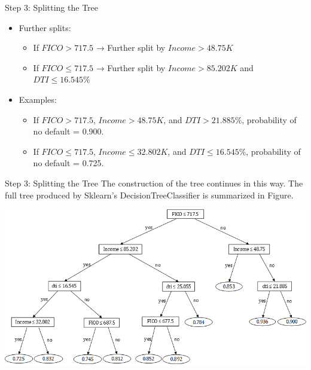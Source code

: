 \documentclass[11pt]{beamer}
\begin{document}
%
%
\begin{frame}{Step 3: Splitting the Tree}
    \begin{itemize}
        \item Further splits:
        \begin{itemize}
            \item If $FICO>717.5$ → Further split by $Income > 48.75K$
            \item If $FICO \le 717.5$ → Further split by $Income > 85.202K$ and $DTI \le 16.545\%$
        \end{itemize}
        \item Examples:
        \begin{itemize}
            \item If $FICO > 717.5$, $Income > 48.75K$, and $DTI > 21.885\%$, probability of no default = 0.900.
            \item If $FICO \le 717.5$, $Income \le 32.802K$, and $DTI \le 16.545\%$, probability of no default = 0.725.
        \end{itemize}
    \end{itemize}
\end{frame}
%
%
\begin{frame}{Step 3: Splitting the Tree}
The construction of the tree continues in this way. The full tree produced
by Sklearn’s DecisionTreeClassifier is summarized in Figure.
	\begin{center}
	\includegraphics[scale=.5]{../05-pictures/lesson-3-3_pic_7.png}
	\end{center}
\end{frame}
%
%
\end{document}
